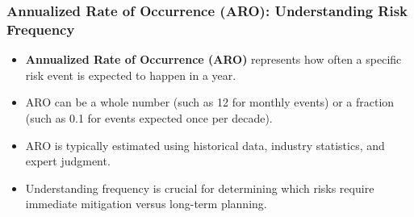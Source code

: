 \documentclass{beamer}
\begin{document}
    \begin{frame}
    \frametitle{Annualized Rate of Occurrence (ARO): Understanding Risk Frequency}
    \begin{itemize}
      \item \textbf{Annualized Rate of Occurrence (ARO)} represents how often a specific risk event is expected to happen in a year.
      \item ARO can be a whole number (such as 12 for monthly events) or a fraction (such as 0.1 for events expected once per decade).
      \item ARO is typically estimated using historical data, industry statistics, and expert judgment.
      \item Understanding frequency is crucial for determining which risks require immediate mitigation versus long-term planning.
    \end{itemize}
    
    \begin{center}
    \end{center}
    \end{frame}
\end{document}
